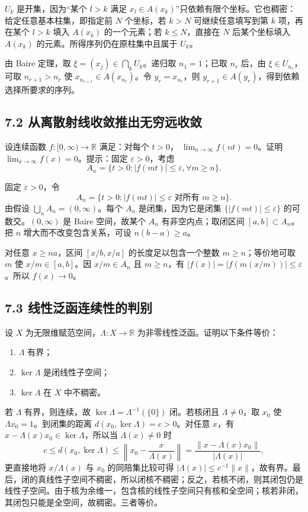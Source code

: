 $U_k$ 是开集，因为“某个 $l>k$ 满足 $x_l\in A(x_k)$”只依赖有限个坐标。它也稠密：给定任意基本柱集，即指定前 $N$ 个坐标，若 $k>N$ 可继续任意填写到第 $k$ 项，再在某个 $l>k$ 填入 $A(x_k)$ 的一个元素；若 $k\le N$，直接在 $N$ 后某个坐标填入 $A(x_k)$ 的元素。所得序列仍在原柱集中且属于 $U_k$。

由 Baire 定理，取 $\xi=(x_j)\in\bigcap_kU_k$。递归取 $n_1=1$；已取 $n_r$ 后，由 $\xi\in U_{n_r}$，可取 $n_{r+1}>n_r$ 使
$x_{n_{r+1}}\in A(x_{n_r})$。令 $y_r=x_{n_r}$，则 $y_{r+1}\in A(y_r)$，得到依赖选择所要求的序列。

\subsection*{7.2 从离散射线收敛推出无穷远收敛}
\begin{problem}
设连续函数 $f:[0,\infty)\to\mathbb R$ 满足：对每个 $t>0$，
$\lim_{n\to\infty}f(nt)=0$。证明 $\lim_{x\to\infty}f(x)=0$。提示：固定 $\varepsilon>0$，考虑
\[
A_n=\{t>0:|f(mt)|\le\varepsilon, \forall m\ge n\}.
\]
\end{problem}
固定 $\varepsilon>0$，令
\[
A_n=\{t>0:|f(mt)|\le\varepsilon\text{ 对所有 }m\ge n\}.
\]
由假设 $\bigcup_nA_n=(0,\infty)$。每个 $A_n$ 是闭集，因为它是闭集
$\{|f(mt)|\le\varepsilon\}$ 的可数交。$(0,\infty)$ 是 Baire 空间，故某个 $A_n$ 有非空内点；取闭区间 $[a,b]\subset A_n$。把 $n$ 增大而不改变包含关系，可设 $n(b-a)\ge a$。

对任意 $x\ge na$，区间 $[x/b,x/a]$ 的长度足以包含一个整数 $m\ge n$；等价地可取 $m$ 使 $x/m\in[a,b]$。因 $x/m\in A_n$ 且 $m\ge n$，有
$|f(x)|=|f(m(x/m))|\le\varepsilon$。所以 $f(x)\to0$。

\subsection*{7.3 线性泛函连续性的判别}
\begin{problem}
设 $X$ 为无限维赋范空间，$\Lambda:X\to\mathbb R$ 为非零线性泛函。证明以下条件等价：
\begin{enumerate}[label=(\arabic*)]
\item $\Lambda$ 有界；
\item $\ker\Lambda$ 是闭线性子空间；
\item $\ker\Lambda$ 在 $X$ 中不稠密。
\end{enumerate}
\end{problem}
若 $\Lambda$ 有界，则连续，故 $\ker\Lambda=\Lambda^{-1}(\{0\})$ 闭。若核闭且 $\Lambda\ne0$，取 $x_0$ 使 $\Lambda x_0=1$。到闭集的距离
$d(x_0,\ker\Lambda)=c>0$。对任意 $x$，有 $x-\Lambda(x)x_0\in\ker\Lambda$，所以当 $\Lambda(x)\ne0$ 时
\[
c\le d(x_0,\ker\Lambda)\le\left\|x_0-\frac{x}{\Lambda(x)}\right\|
=\frac{\|x-\Lambda(x)x_0\|}{|\Lambda(x)|},
\]
更直接地将 $x/\Lambda(x)$ 与 $x_0$ 的同陪集比较可得
$|\Lambda(x)|\le c^{-1}\|x\|$，故有界。最后，闭的真线性子空间不稠密，所以闭核不稠密；反之，若核不闭，则其闭包仍是线性子空间。由于核为余维一，包含核的线性子空间只有核和全空间；核若非闭，其闭包只能是全空间，故稠密。三者等价。

